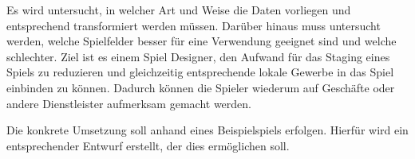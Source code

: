 Es wird untersucht, in welcher Art und Weise die Daten vorliegen und entsprechend transformiert werden müssen.
Darüber hinaus muss untersucht werden, welche Spielfelder besser für eine Verwendung geeignet sind und welche schlechter.
Ziel ist es einem Spiel Designer, den Aufwand für das Staging eines Spiels zu reduzieren und gleichzeitig entsprechende lokale Gewerbe in das Spiel einbinden zu können. Dadurch können die Spieler wiederum auf Geschäfte oder andere Dienstleister aufmerksam gemacht werden.

Die konkrete Umsetzung soll anhand eines Beispielspiels erfolgen.
Hierfür wird ein entsprechender Entwurf erstellt, der dies ermöglichen soll.

